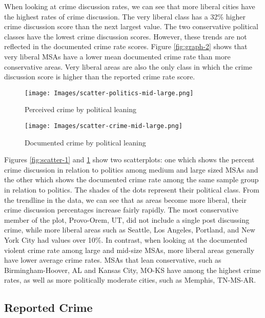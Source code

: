 \documentclass[12pt,oneside, letterpaper]{book}
\begin{document}
\par When looking at crime discussion rates, we can see that more liberal cities have the highest rates of crime discussion. The very liberal class has a 32\% higher crime discussion score than the next largest value. The two conservative political classes have the lowest crime discussion scores. However, these trends are not reflected in the documented crime rate scores. Figure \ref{fig:graph-2} shows that very liberal MSAs have a lower mean documented crime rate than more conservative areas. Very liberal areas are also the only class in which the crime discussion score is higher than the reported crime rate score.

\begin{figure}[!tbp]
  \centering
  \begin{minipage}[b]{0.45\textwidth}
    \texttt{[image: Images/scatter-politics-mid-large.png]}
    \caption{Perceived crime by political leaning}
    \label{fig:scatter-1}
  \end{minipage}
  \hfill
  \begin{minipage}[b]{0.45\textwidth}
    \texttt{[image: Images/scatter-crime-mid-large.png]}
    \caption{Documented crime by political leaning}
    \label{fig:scatter-2}
  \end{minipage}
\end{figure}

\par Figures \ref{fig:scatter-1} and \ref{fig:scatter-2} show two scatterplots: one which shows the percent crime discussion in relation to politics among medium and large sized MSAs and the other which shows the documented crime rate among the same sample group in relation to politics. The shades of the dots represent their political class. From the trendline in the data, we can see that as areas become more liberal, their crime discussion percentages increase fairly rapidly. The most conservative member of the plot, Provo-Orem, UT, did not include a single post discussing crime, while more liberal areas such as Seattle, Los Angeles, Portland, and New York City had values over 10\%. In contrast, when looking at the documented violent crime rate among large and mid-size MSAs, more liberal areas generally have lower average crime rates. MSAs that lean conservative, such as Birmingham-Hoover, AL and Kansas City, MO-KS have among the highest crime rates, as well as more politically moderate cities, such as Memphis, TN-MS-AR.

\subsection{Reported Crime}
\end{document}
